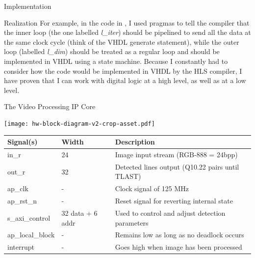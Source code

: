 \documentclass{matthijs}
\begin{document}
\begin{hoofdstuk}{Implementation}
\begin{paragraaf}{Realization}
			\noindent For example, in the code in , I used pragmas to tell the compiler that the inner loop (the one labelled \textit{l\_iter}) should be pipelined to send all the data at the same clock cycle (think of the VHDL generate statement), while the outer loop (labelled \textit{l\_dim}) should be treated as a regular loop and should be implemented in VHDL using a state machine.
			Because I constantly had to consider how the code would be implemented in VHDL by the HLS compiler, I have proven that I can work with digital logic at a high level, as well as at a low level.

			\vspace{1ex}
			\begin{figuur}{The Video Processing IP Core}
				\centerline{
					\texttt{[image: hw-block-diagram-v2-crop-asset.pdf]}
				}

				\vspace{3ex}

				{
				\small
				\begin{tabular}{l l l}
					\toprule
					Signal(s) & Width & Description \\
					\midrule
					in\_r & \qty{24}{\bit} & Image input stream (RGB-888 = 24bpp) \\
					out\_r & \qty{32}{\bit} & Detected lines output (Q10.22 pairs until TLAST) \\
					ap\_clk & - & Clock signal of 125 MHz \\
					ap\_rst\_n & - & Reset signal for reverting internal state \\
					s\_axi\_control & \qty{32}{\bit} data + \qty{6}{\bit} addr & Used to control and adjust detection parameters \\
					ap\_local\_block & - & Remains low as long as no deadlock occurs \\
					interrupt & - & Goes high when image has been processed \\
					\bottomrule
				\end{tabular}
				}
			\end{figuur}


\end{paragraaf}
\end{hoofdstuk}
\end{document}
